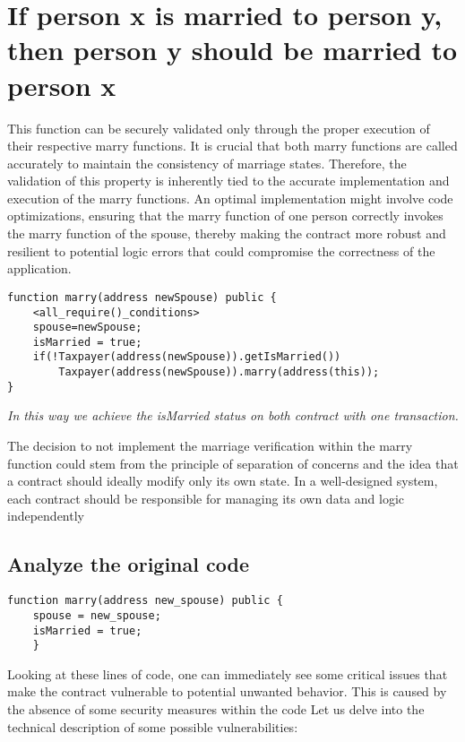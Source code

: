 \documentclass{article}
\begin{document}
\section{If person x is married to person y, then person y should be married to person x}
This function can be securely validated only through the proper execution of their respective marry functions. It is crucial that both marry functions are called accurately to maintain the consistency of marriage states. Therefore, the validation of this property is inherently tied to the accurate implementation and execution of the marry functions. An optimal implementation might involve code optimizations, ensuring that the marry function of one person correctly invokes the marry function of the spouse, thereby making the contract more robust and resilient to potential logic errors that could compromise the correctness of the application. 
\begin{verbatim}
function marry(address newSpouse) public {
    <all_require()_conditions>
    spouse=newSpouse;
    isMarried = true;
    if(!Taxpayer(address(newSpouse)).getIsMarried())
        Taxpayer(address(newSpouse)).marry(address(this));
}
\end{verbatim}

\textit{In this way we achieve the isMarried status on both contract with one transaction.}

The decision to not implement the marriage verification within the marry function could stem from the principle of separation of concerns and the idea that a contract should ideally modify only its own state. In a well-designed system, each contract should be responsible for managing its own data and logic independently
\subsection{Analyze the original code}
\begin{verbatim}
function marry(address new_spouse) public {
    spouse = new_spouse;
    isMarried = true;
    }
\end{verbatim}
Looking at these lines of code, one can immediately see some critical issues that make the contract vulnerable to potential unwanted behavior. This is caused by the absence of some security measures within the code Let us delve into the technical description of some possible vulnerabilities:
 
\end{document}
